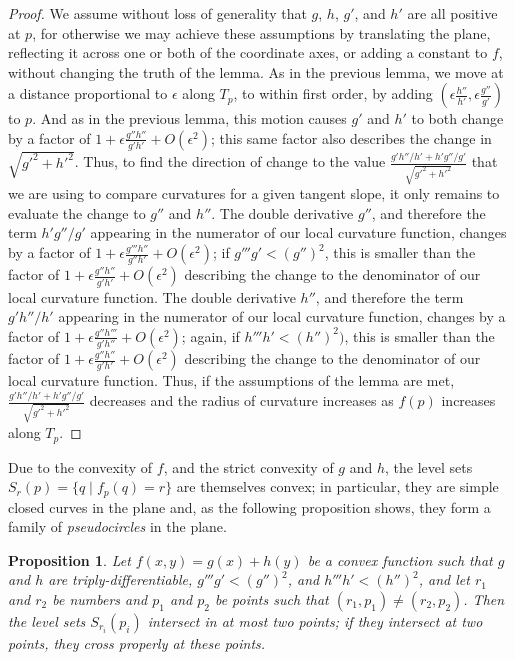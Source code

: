 \documentclass[10pt, conference, compsocconf]{IEEEtran}
\newtheorem{proposition}[theorem]{Proposition}
\begin{document}
\begin{proof}
We assume without loss of generality that $g$, $h$, $g'$, and $h'$ are all positive at $p$, for otherwise we may achieve these assumptions by translating the plane, reflecting it across one or both of the coordinate axes, or adding a constant to $f$, without changing the truth of the lemma.
As in the previous lemma, we move at a distance proportional to $\epsilon$ along $T_p$, to within first order, by adding $(\epsilon\frac{h''}{h'},\epsilon\frac{g''}{g'})$ to $p$. And as in the previous lemma, this motion causes $g'$ and $h'$ to both change by a factor of $1+\epsilon\frac{g''h''}{g'h'}+O(\epsilon^2)$; this same factor also describes the change in $\sqrt{g'^2+h'^2}$. Thus, to find the direction of change to
the value $\frac{g'h''/h' +
h'g''/g'}{\sqrt{g'^2+h'^2}}$ that we are using to compare curvatures for a given tangent slope, it only remains to evaluate the change to $g''$ and $h''$. The double derivative $g''$, and therefore the term $h'g''/g'$ appearing in the numerator of our local curvature function, changes by a factor of
$1+\epsilon\frac{g'''h''}{g''h'}+O(\epsilon^2)$; if $g'''g'<(g'')^2$, this is smaller than the factor of $1+\epsilon\frac{g''h''}{g'h'}+O(\epsilon^2)$ describing the change to the denominator of our local curvature function. The double derivative $h''$, and therefore the term $g'h''/h'$ appearing in the numerator of our local curvature function, changes by a factor of $1+\epsilon\frac{g''h'''}{g'h''}+O(\epsilon^2)$; again, if $h'''h'<(h'')^2)$, this is smaller than the factor of $1+\epsilon\frac{g''h''}{g'h'}+O(\epsilon^2)$ describing the change to the denominator of our local curvature function. Thus, if the assumptions of the lemma are met, $\frac{g'h''/h' +
h'g''/g'}{\sqrt{g'^2+h'^2}}$ decreases and the radius of curvature increases as $f(p)$ increases along $T_p$.
\end{proof}

Due to the convexity of $f$, and the strict convexity of $g$ and $h$, the level sets $S_r(p)=\{q\mid f_p(q)=r\}$ are themselves convex; in particular, they are simple closed curves in the plane and, as the following proposition shows, they form a family of \emph{pseudocircles} in the plane.

\begin{proposition}
\label{prop:pseudocircles}
Let $f(x,y)=g(x)+h(y)$ be a convex function such that $g$ and $h$ are triply-differentiable, $g'''g'<(g'')^2$, and $h'''h'<(h'')^2$, and let $r_1$ and $r_2$ be numbers and $p_1$ and $p_2$ be points such that $(r_1,p_1)\ne (r_2,p_2)$. Then the level sets $S_{r_i}(p_i)$ intersect in at most two points; if they intersect at two points, they cross properly at these points.
\end{proposition}
\end{document}
